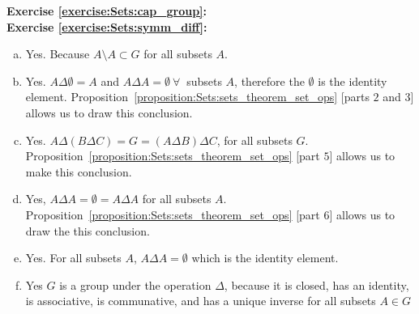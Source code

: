 \noindent\textbf{Exercise \ref{exercise:Sets:cap_group}:}\\

\noindent\textbf{Exercise \ref{exercise:Sets:symm_diff}:} %
\begin{enumerate}[(a)]
\item
Yes. Because $A\setminus A\subset G$ for all subsets $A$.

\item
Yes. $A\Delta \emptyset=A$ and $A\Delta A=\emptyset\ \forall\ $ subsets $A$, therefore the $\emptyset$ is the identity element. Proposition~\ref{proposition:Sets:sets_theorem_set_ops} [parts $2$ and $3$] allows us to draw this conclusion.

\item
Yes. $A\Delta (B \Delta C) = G = (A\Delta B)\Delta C$, for all subsets $G$. Proposition~\ref{proposition:Sets:sets_theorem_set_ops} [part $5$] allows us to make this conclusion.

\item
Yes, $A\Delta A=\emptyset=A\Delta A$ for all subsets $A$. Proposition~\ref{proposition:Sets:sets_theorem_set_ops} [part $6$] allows us to draw the this conclusion.

\item
Yes. For all subsets $A$, $A\Delta A=\emptyset$ which is the identity element.

\item
Yes $G$ is a group under the operation $\Delta$, because it is closed, has an identity, is associative, is communative, and has a unique inverse for all subsets $A\in G$
\end{enumerate}